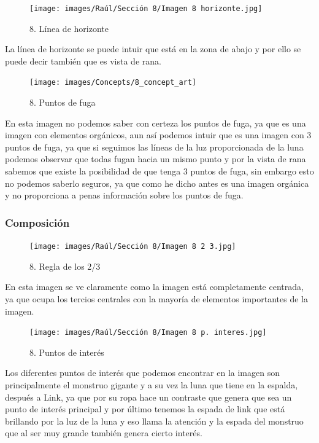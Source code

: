 \documentclass[12pt]{article}
\begin{document}
\begin{figure}[H]
      \centering
      \texttt{[image: images/Raúl/Sección 8/Imagen 8 horizonte.jpg]}
      \caption{\small 8. Línea de horizonte}
    \end{figure}

La línea de horizonte se puede intuir que está en la zona de abajo y por ello se puede decir también que es vista de rana.

\begin{figure}[H]
      \centering
      \texttt{[image: images/Concepts/8\_concept\_art]}
      \caption{\small 8. Puntos de fuga}
    \end{figure}
    
En esta imagen no podemos saber con certeza los puntos de fuga, ya que es una imagen con elementos orgánicos, aun así podemos intuir que es una imagen con 3 puntos de fuga, ya que si seguimos las líneas de la luz proporcionada de la luna podemos observar que todas fugan hacia un mismo punto y por la vista de rana sabemos que existe la posibilidad de que tenga 3 puntos de fuga, sin embargo esto no podemos saberlo seguros, ya que como he dicho antes es una imagen orgánica y no proporciona a penas información sobre los puntos de fuga.

        \subsubsection{Composición}

\begin{figure}[H]
      \centering
      \texttt{[image: images/Raúl/Sección 8/Imagen 8 2 3.jpg]}
      \caption{\small 8. Regla de los 2/3}
    \end{figure}

En esta imagen se ve claramente como la imagen está completamente centrada, ya que ocupa los tercios centrales con la mayoría de elementos importantes de la imagen.

\begin{figure}[H]
      \centering
      \texttt{[image: images/Raúl/Sección 8/Imagen 8 p. interes.jpg]}
      \caption{\small 8. Puntos de interés}
    \end{figure}

Los diferentes puntos de interés que podemos encontrar en la imagen son principalmente el monstruo gigante y a su vez la luna que tiene en la espalda, después a Link, ya que por su ropa hace un contraste que genera que sea un punto de interés principal y por último tenemos la espada de link que está brillando por la luz de la luna y eso llama la atención y la espada del monstruo que al ser muy grande también genera cierto interés.
\end{document}
